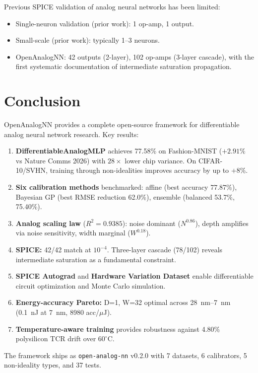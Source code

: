 \documentclass[10pt,twocolumn]{article}
\begin{document}
Previous SPICE validation of analog neural networks has been limited:
\begin{itemize}
  \item Single-neuron validation (prior work): 1 op-amp, 1 output.
  \item Small-scale (prior work): typically 1--3 neurons.
  \item OpenAnalogNN: 42 outputs (2-layer), 102 op-amps (3-layer cascade), with the first systematic documentation of intermediate saturation propagation.
\end{itemize}

\section{Conclusion}

OpenAnalogNN provides a complete open-source framework for differentiable analog neural network research. Key results:
\begin{enumerate}
  \item \textbf{DifferentiableAnalogMLP} achieves 77.58\% on Fashion-MNIST ($+2.91\%$ vs Nature Comms 2026) with $28\times$ lower chip variance. On CIFAR-10/SVHN, training through non-idealities improves accuracy by up to $+8\%$.
  \item \textbf{Six calibration methods} benchmarked: affine (best accuracy 77.87\%), Bayesian GP (best RMSE reduction 62.0\%), ensemble (balanced 53.7\%, 75.40\%).
  \item \textbf{Analog scaling law} ($R^2 = 0.9385$): noise dominant ($N^{0.86}$), depth amplifies via noise sensitivity, width marginal ($W^{0.18}$).
  \item \textbf{SPICE:} 42/42 match at $10^{-4}$. Three-layer cascade (78/102) reveals intermediate saturation as a fundamental constraint.
  \item \textbf{SPICE Autograd} and \textbf{Hardware Variation Dataset} enable differentiable circuit optimization and Monte Carlo simulation.
  \item \textbf{Energy-accuracy Pareto:} D=1, W=32 optimal across 28~nm--7~nm (0.1~nJ at 7~nm, 8980 acc/$\mu$J).
  \item \textbf{Temperature-aware training} provides robustness against 4.80\% polysilicon TCR drift over $60^\circ$C.
\end{enumerate}

The framework ships as \texttt{open-analog-nn} v0.2.0 with 7 datasets, 6 calibrators, 5 non-ideality types, and 37 tests.
\end{document}

